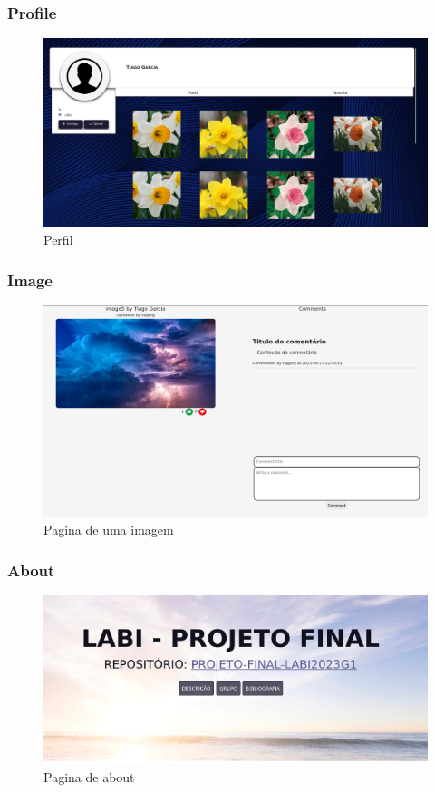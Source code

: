 \documentclass{report}
\begin{document}
\subsubsection{Profile}

\begin{figure}[H]
    \centering
    \includegraphics[scale=0.2]{../images/profile}
    \caption{Perfil}
    \label{fig:profile}
\end{figure}

\subsubsection{Image}

\begin{figure}[H]
    \centering
    \includegraphics[scale=0.2]{../images/image}
    \caption{Pagina de uma imagem}
    \label{fig:image}
\end{figure}

\subsubsection{About}

\begin{figure}[H]
    \centering
    \includegraphics[scale=0.2]{../images/About}
    \caption{Pagina de about}
    \label{fig:about}
\end{figure}
\end{document}
